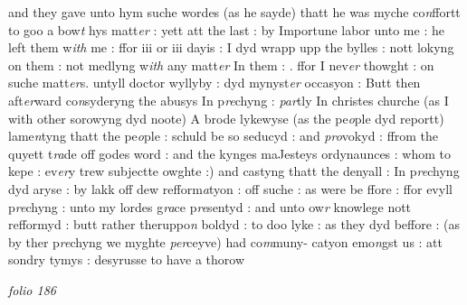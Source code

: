 \documentclass[12pt, a4paper]{book}
\begin{document}
            			 and they gave
            			unto hym suche wordes (as he sayde) thatt he was myche co\textit{n}ffortt
            			to goo a bow\textit{t} hys matt\textit{er} : yett att the last : by
            			Importune labor unto me : he left them w\textit{ith} me : ffor iii or iii
            			dayis : I dyd wrapp upp the bylles : nott lokyng on them : not medlyng
            			w\textit{ith} any matt\textit{er} In them : . ffor I
            			nev\textit{er} thowght : on suche matt\textit{er}s. untyll  doctor
            					wyllyby : dyd
            			mynyst\textit{er} occasyon : Butt then aft\textit{er}ward
            			co\textit{n}syderyng the abusys In p\textit{re}chyng :
            			\textit{par}tly In christes churche (as I with other sorowyng dyd
            			noote) A brode lykewyse (as the pe\textit{o}ple dyd reportt)
            			lame\textit{n}tyng thatt the pe\textit{o}ple : schuld be so
            			seducyd : and \textit{pro}vokyd : ffrom the quyett t\textit{ra}de
            			off godes word : and the kynges maJesteys ordynaunces : whom to kepe :
            			ev\textit{er}y trew subjectte owghte :) and castyng thatt the denyall
            			: In p\textit{re}chyng dyd aryse : by lakk off dew
            			refform\textit{a}tyon : off suche : as were be ffore : ffor evyll
            			p\textit{re}chyng : unto my lordes g\textit{ra}ce
            			p\textit{re}sentyd : and unto ow\textit{r} knowlege nott
            			refformyd : butt rather theruppo\textit{n} boldyd : to doo lyke : as they
            			dyd beffore : (as by ther p\textit{re}chyng we myghte
            			\textit{per}ceyve) had co\textit{m}muny- catyon
            					emo\textit{n}gst us : att sondry tymys : desyrusse to have a thorow
            			
            	
\dotfill
						\newpage
{}

\textit{folio 186}
            		
            		
            		
\end{document}
